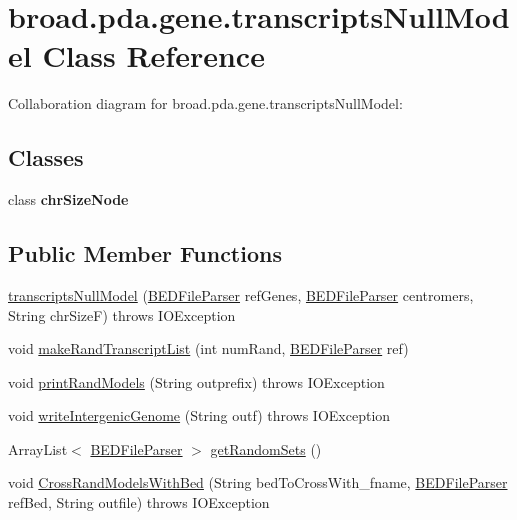 \hypertarget{classbroad_1_1pda_1_1gene_1_1transcripts_null_model}{\section{broad.\+pda.\+gene.\+transcripts\+Null\+Model Class Reference}
\label{classbroad_1_1pda_1_1gene_1_1transcripts_null_model}
}


Collaboration diagram for broad.\+pda.\+gene.\+transcripts\+Null\+Model\+:
\subsection*{Classes}
\begin{DoxyCompactItemize}
\item 
class {\bfseries chr\+Size\+Node}
\end{DoxyCompactItemize}
\subsection*{Public Member Functions}
\begin{DoxyCompactItemize}
\item 
\hyperlink{classbroad_1_1pda_1_1gene_1_1transcripts_null_model_a962e8a980d4316b3deea248692217475}{transcripts\+Null\+Model} (\hyperlink{classbroad_1_1pda_1_1annotation_1_1_b_e_d_file_parser}{B\+E\+D\+File\+Parser} ref\+Genes, \hyperlink{classbroad_1_1pda_1_1annotation_1_1_b_e_d_file_parser}{B\+E\+D\+File\+Parser} centromers, String chr\+Size\+F)  throws I\+O\+Exception 
\item 
void \hyperlink{classbroad_1_1pda_1_1gene_1_1transcripts_null_model_aa726b43dff83e7c3c376c79925267f8d}{make\+Rand\+Transcript\+List} (int num\+Rand, \hyperlink{classbroad_1_1pda_1_1annotation_1_1_b_e_d_file_parser}{B\+E\+D\+File\+Parser} ref)
\item 
void \hyperlink{classbroad_1_1pda_1_1gene_1_1transcripts_null_model_a76def0535f4a96f6b79415a9a4850aea}{print\+Rand\+Models} (String outprefix)  throws I\+O\+Exception 
\item 
void \hyperlink{classbroad_1_1pda_1_1gene_1_1transcripts_null_model_a6c13ff1e4fff0478a486b371fa0b6c94}{write\+Intergenic\+Genome} (String outf)  throws I\+O\+Exception 
\item 
Array\+List$<$ \hyperlink{classbroad_1_1pda_1_1annotation_1_1_b_e_d_file_parser}{B\+E\+D\+File\+Parser} $>$ \hyperlink{classbroad_1_1pda_1_1gene_1_1transcripts_null_model_af798a0b8314aa0e8b874fb345af3ae44}{get\+Random\+Sets} ()
\item 
void \hyperlink{classbroad_1_1pda_1_1gene_1_1transcripts_null_model_afdfbc5fab3964d33ecb497cec6a84d37}{Cross\+Rand\+Models\+With\+Bed} (String bed\+To\+Cross\+With\+\_\+fname, \hyperlink{classbroad_1_1pda_1_1annotation_1_1_b_e_d_file_parser}{B\+E\+D\+File\+Parser} ref\+Bed, String outfile)  throws I\+O\+Exception 
\end{DoxyCompactItemize}


